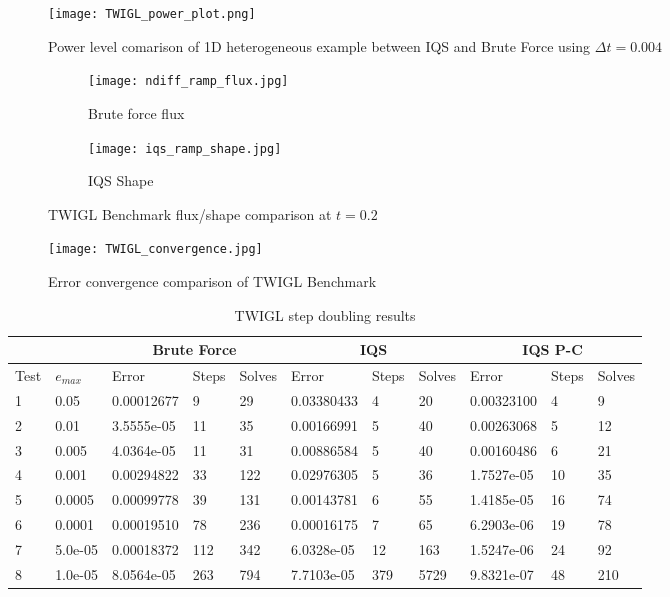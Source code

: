 \documentclass[10pt]{scrartcl}
\begin{document}
\begin{figure}[!htbp]
\centering
\texttt{[image: TWIGL\_power\_plot.png]}
\caption{Power level comarison of 1D heterogeneous example between IQS and Brute Force using $\Delta t = 0.004$}
\label{fig:TWIGL_power}
\end{figure}

\begin{figure}[!htbp]
\begin{center}
\begin{subfigure}[!htbp]{0.4\textwidth}
\texttt{[image: ndiff\_ramp\_flux.jpg]}
\caption{Brute force flux}
\end{subfigure}
\quad
\begin{subfigure}[!htbp]{0.4\textwidth}
\texttt{[image: iqs\_ramp\_shape.jpg]}
\caption{IQS Shape}
\end{subfigure}
\caption{TWIGL Benchmark flux/shape comparison at $t=0.2$}
\label{fig:TWIGL_plots}
\end{center}
\end{figure}

\begin{figure}[!htbp]
\centering
\texttt{[image: TWIGL\_convergence.jpg]}
\caption{Error convergence comparison of TWIGL Benchmark}
\label{fig:TWIGL_conv}
\end{figure}

\begin{table}[!htbp]
\begin{center}
\caption{TWIGL step doubling results}
\label{tab:TWIGLdt2}
\begin{tabular}{|l|l|l|l|l|l|l|l|l|l|l|}
\hline
  &  & \multicolumn{3}{|c|}{Brute Force} & \multicolumn{3}{|c|}{IQS} & \multicolumn{3}{|c|}{IQS P-C} \\
\hline
Test & $e_{max}$ & Error & Steps & Solves & Error & Steps & Solves & Error & Steps & Solves \\
\hline
1 &	0.05    &	0.00012677 &	9   &	29  &	0.03380433 &	4   &	20   &	0.00323100 &	4  &	9   \\
2 &	0.01    &	3.5555e-05 &	11  &	35  &	0.00166991 &	5   &	40   &	0.00263068 &	5  &	12  \\
3 &	0.005   &	4.0364e-05 &	11  &	31  &	0.00886584 &	5   &	40   &	0.00160486 &	6  &	21  \\
4 &	0.001   &	0.00294822 &	33  &	122 &	0.02976305 &	5   &	36   &	1.7527e-05 &	10 &	35  \\
5 &	0.0005  &	0.00099778 &	39  &	131 &	0.00143781 &	6   &	55   &	1.4185e-05 &	16 &	74  \\
6 &	0.0001  &	0.00019510 &	78  &	236 &	0.00016175 &	7   &	65   &	6.2903e-06 &	19 &	78  \\
7 &	5.0e-05 &	0.00018372 &	112 &	342 &	6.0328e-05 &	12  &	163  &	1.5247e-06 &	24 &	92  \\
8 &	1.0e-05 &	8.0564e-05 &	263 &	794 &	7.7103e-05 &	379 &	5729 &	9.8321e-07 &	48 &	210 \\
\hline

\end{tabular}
\end{center}
\end{table}
\end{document}
